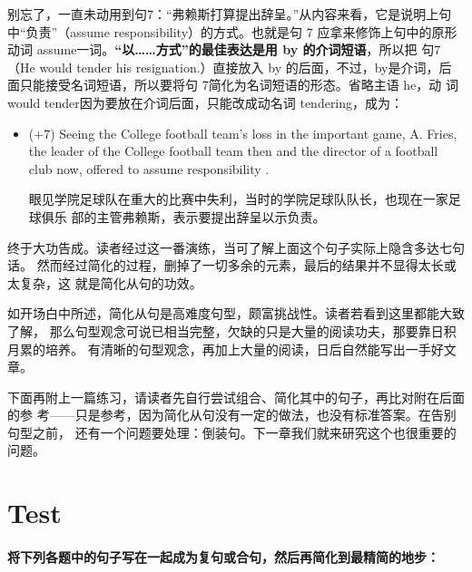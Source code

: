 别忘了，一直未动用到句7：“弗赖斯打算提出辞呈。”从内容来看，它是说明上句
中“负责”（assume responsibility）的方式。也就是句 7 应拿来修饰上句中的原形
动词 assume一词。\textbf{“以……方式”的最佳表达是用 by 的介词短语}，所以把
句7（He would tender his resignation.）直接放入 by 的后面，不过，by是介词，后
面只能接受名词短语，所以要将句 7简化为名词短语的形态。省略主语 he，动
词 would tender因为要放在介词后面，只能改成动名词 tendering，成为：
\begin{itemize}
\item (+7) Seeing the College football team's loss in the important game, A.
  Fries, the leader of the College football team then and the director of a
  football club now, offered to assume responsibility .

  眼见学院足球队在重大的比赛中失利，当时的学院足球队队长，也现在一家足球俱乐
  部的主管弗赖斯，表示要提出辞呈以示负责。
\end{itemize}
终于大功告成。读者经过这一番演练，当可了解上面这个句子实际上隐含多达七句话。
然而经过简化的过程，删掉了一切多余的元素，最后的结果并不显得太长或太复杂，这
就是简化从句的功效。

如开场白中所述，简化从句是高难度句型，颇富挑战性。读者若看到这里都能大致了解，
那么句型观念可说已相当完整，欠缺的只是大量的阅读功夫，那要靠日积月累的培养。
有清晰的句型观念，再加上大量的阅读，日后自然能写出一手好文章。

下面再附上一篇练习，请读者先自行尝试组合、简化其中的句子，再比对附在后面的参
考——只是参考，因为简化从句没有一定的做法，也没有标准答案。在告别句型之前，
还有一个问题要处理：倒装句。下一章我们就来研究这个也很重要的问题。

\section{Test}

\paragraph{将下列各题中的句子写在一起成为复句或合句，然后再简化到最精简的地步：}

